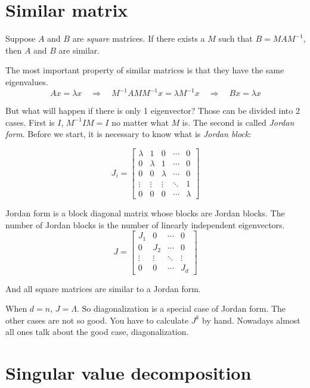 \documentclass[10pt,a4paper,oneside,numbers=noenddot]{scrbook}
\theoremstyle{ctplain}
\theoremstyle{ctresult}
\begin{document}
\section{Similar matrix}

Suppose $A$ and $B$ are \emph{square} matrices. If there exists a $M$ such that
$B = MAM^{-1}$, then $A$ and $B$ are similar.

The most important property of similar matrices is that they have the same eigenvalues.
\[
  Ax = \lambda x \quad \Rightarrow \quad
  M^{-1}AMM^{-1}x = \lambda M^{-1}x \quad \Rightarrow \quad Bx = \lambda x
\]

But what will happen if there is only 1 eigenvector? Those can be divided into 2
cases. First is $I$, $M^{-1}IM = I$ no matter what $M$ is. The second is called
\emph{Jordan form}. Before we start, it is necessary to know what is \emph{Jordan
block}:

\[
  J_i = \begin{bmatrix}
    \lambda & 1 & 0 & \cdots & 0 \\
    0 & \lambda & 1 & \cdots & 0 \\
    0 & 0 & \lambda & \cdots & 0 \\
    \vdots & \vdots & \vdots & \ddots & 1 \\
    0 & 0 & 0 & \cdots & \lambda
  \end{bmatrix}
\]

Jordan form is a block diagonal matrix whose blocks are Jordan blocks. The number of
Jordan blocks is the number of linearly independent eigenvectors.
\[
  J = \begin{bmatrix}
    J_1 & 0 & \cdots & 0 \\
    0 & J_2 & \cdots & 0 \\
    \vdots & \vdots & \ddots & \vdots \\
    0 & 0 & \cdots & J_d
  \end{bmatrix}
\]

And all square matrices are similar to a Jordan form.

When $d = n$, $J = \Lambda$. So diagonalization is a special case of Jordan form. The
other cases are not so good. You have to calculate $J^k$ by hand. Nowadays almost all
ones talk about the good case, diagonalization.

\section{Singular value decomposition}
\end{document}
